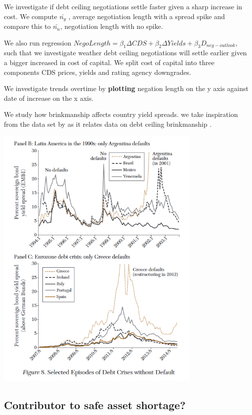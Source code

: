 \documentclass[
  12pt]{article}
\begin{document}
We investigate if debt ceiling negotiations settle faster given a sharp
increase in cost. We compute \(\bar{n_{y}}\) , average negotiation
length with a spread spike and compare this to \(\bar{n_{n}}\),
negotiation length with no spike.

We also run regression
\(NegoLength=\beta_1\Delta CDS+\beta_2\Delta Yields+\beta_3D_{neg-outlook}\),
such that we investigate weather debt ceiling negotiations will settle
earlier given a bigger increased in cost of capital. We split cost of
capital into three components CDS prices, yields and rating agency
downgrades.

We investigate trends overtime by \textbf{plotting} negation length on
the y axis against date of increase on the x axis.

We study how brinkmanship affects country yield spreads. we take
inspiration from the data set by \citep{meyer2022} as it relates data on
debt ceiling brinkmanship \citep{reinhart2008}.

\includegraphics[width=3.94792in,height=\textheight]{style-guide/overtime_brink_2.png}

\hypertarget{contributor-to-safe-asset-shortage}{%
\subsection{Contributor to safe asset
shortage?}\label{contributor-to-safe-asset-shortage}}
\end{document}
